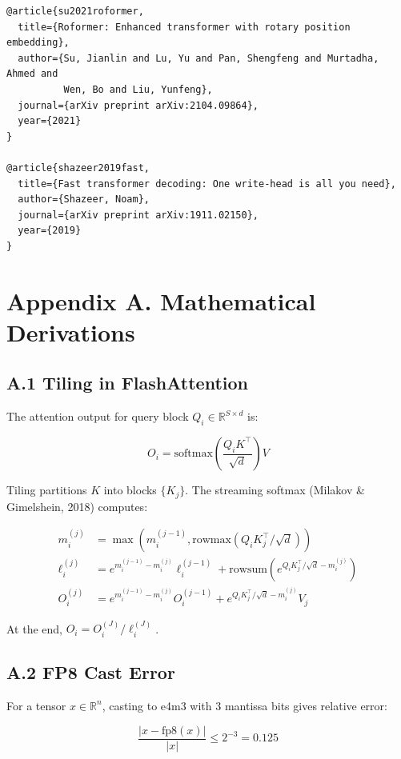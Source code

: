 \begin{lstlisting}
@article{su2021roformer,
  title={Roformer: Enhanced transformer with rotary position embedding},
  author={Su, Jianlin and Lu, Yu and Pan, Shengfeng and Murtadha, Ahmed and 
          Wen, Bo and Liu, Yunfeng},
  journal={arXiv preprint arXiv:2104.09864},
  year={2021}
}

@article{shazeer2019fast,
  title={Fast transformer decoding: One write-head is all you need},
  author={Shazeer, Noam},
  journal={arXiv preprint arXiv:1911.02150},
  year={2019}
}
\end{lstlisting}




\section{Appendix A. Mathematical Derivations}

\subsection{A.1 Tiling in FlashAttention}

The attention output for query block $Q_i \in \mathbb{R}^{S \times d}$ is:

\[
O_i = \text{softmax}\!\left(\frac{Q_i K^\top}{\sqrt{d}}\right) V
\tag{A.1}
\]

Tiling partitions $K$ into blocks $\{K_j\}$. The streaming softmax (Milakov 
\& Gimelshein, 2018) computes:

\[
\begin{aligned}
m_i^{(j)} &= \max(m_i^{(j-1)}, \text{rowmax}(Q_i K_j^\top / \sqrt{d})) \\
\ell_i^{(j)} &= e^{m_i^{(j-1)} - m_i^{(j)}} \ell_i^{(j-1)} 
              + \text{rowsum}(e^{Q_i K_j^\top / \sqrt{d} - m_i^{(j)}}) \\
O_i^{(j)} &= e^{m_i^{(j-1)} - m_i^{(j)}} O_i^{(j-1)} 
          + e^{Q_i K_j^\top / \sqrt{d} - m_i^{(j)}} V_j
\end{aligned}
\tag{A.2}
\]

At the end, $O_i = O_i^{(J)} / \ell_i^{(J)}$.

\subsection{A.2 FP8 Cast Error}

For a tensor $x \in \mathbb{R}^n$, casting to e4m3 with 3 mantissa bits gives 
relative error:

\[
\frac{|x - \text{fp8}(x)|}{|x|} \leq 2^{-3} = 0.125
\tag{A.3}
\]

